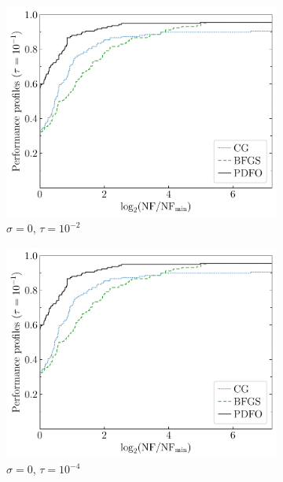 \documentclass[manuscript,screen,review]{acmart}
\numberwithin{equation}{section}
\begin{document}
\begin{figure}[htbp]
    \begin{subfigure}{.48\textwidth}
        \centering
        \includegraphics[width=\textwidth,page=2]{perf-plain-bfgs_cg_pdfo-50.pdf}
        \caption{$\sigma = 0$, $\tau = 10^{-2}$}
    \end{subfigure}
    \hfill
    \begin{subfigure}{.48\textwidth}
        \centering
        \includegraphics[width=\textwidth,page=4]{perf-plain-bfgs_cg_pdfo-50.pdf}
        \caption{$\sigma = 0$, $\tau = 10^{-4}$}
    \end{subfigure}
    \hfill
    \begin{subfigure}{.48\textwidth}

\end{subfigure}
\end{figure}
\end{document}
